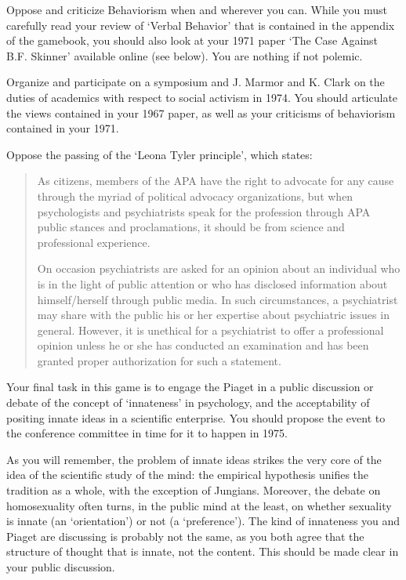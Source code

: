 \begin{refsection}
Oppose and criticize Behaviorism when and wherever you can. While you must carefully read your review of `Verbal Behavior' that is contained in the appendix of the gamebook, you should also look at your 1971 paper `The Case Against B.F. Skinner' available online (see below). You are nothing if not polemic.

Organize and participate on a symposium and J. Marmor and K. Clark on the duties of academics with respect to social activism in 1974. You should articulate the views contained in your 1967 paper, as well as your criticisms of behaviorism contained in your 1971.

Oppose the passing of the `Leona Tyler principle', which states:

\begin{quote}

As citizens, members of the APA have the right to advocate for any cause through the myriad of political advocacy organizations, but when psychologists and psychiatrists speak for the profession through APA public stances and proclamations, it should be from science and professional experience.

On occasion psychiatrists are asked for an opinion about an individual who is in the light of public attention or who has disclosed information about himself\slash herself through public media. In such circumstances, a psychiatrist may share with the public his or her expertise about psychiatric issues in general. However, it is unethical for a psychiatrist to offer a professional opinion unless he or she has conducted an examination and has been granted proper authorization for such a statement.
\end{quote}

Your final task in this game is to engage the Piaget in a public discussion or debate of the concept of `innateness' in psychology, and the acceptability of positing innate ideas in a scientific enterprise. You should propose the event to the conference committee in time for it to happen in 1975.

As you will remember, the problem of innate ideas strikes the very core of the idea of the scientific study of the mind: the empirical hypothesis unifies the tradition as a whole, with the exception of Jungians. Moreover, the debate on homosexuality often turns, in the public mind at the least, on whether sexuality is innate (an `orientation') or not (a `preference'). The kind of innateness you and Piaget are discussing is probably not the same, as you both agree that the structure of thought that is innate, not the content. This should be made clear in your public discussion.


\end{refsection}
